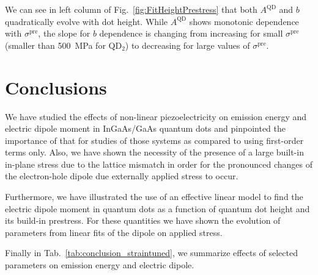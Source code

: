 We can see in left column of Fig.~\ref{fig:FitHeightPrestress} that both $A^\mathrm{QD}$ and $b$ quadratically evolve with dot height. While $A^\mathrm{QD}$ shows monotonic dependence with $\sigma^\mathrm{pre}$, the slope for $b$ dependence is changing from increasing for small $\sigma^\mathrm{pre}$ (smaller than 500~MPa for QD$_2$) to decreasing for large values of $\sigma^\mathrm{pre}$.



%










\newpage

\section{Conclusions}
We have studied the effects of non-linear piezoelectricity on emission energy and electric dipole moment in InGaAs/GaAs quantum dots and pinpointed the importance of that for studies of those systems as compared to using first-order terms only. 
Also, we have shown the necessity of the presence of a large built-in in-plane stress due to the lattice mismatch in order for the pronounced changes of the electron-hole dipole due externally applied stress to occur. 

Furthermore, we have illustrated the use of an effective linear model to find the electric dipole moment in quantum dots as a function of quantum dot height and its build-in prestress. For these quantities we have shown the evolution of parameters from linear fits of the dipole on applied stress. 

Finally in Tab.~\ref{tab:conclusion_straintuned}, we summarize effects of selected parameters on emission energy and electric dipole.

